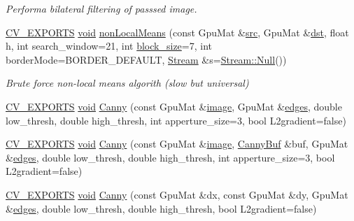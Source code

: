 \begin{DoxyCompactItemize}
\begin{DoxyCompactList}\small\item\em Performa bilateral filtering of passsed image. \end{DoxyCompactList}\item 
\hyperlink{core_2types__c_8h_a1bf9f0e121b54272da02379cfccd0a2b}{C\-V\-\_\-\-E\-X\-P\-O\-R\-T\-S} \hyperlink{legacy_8hpp_a8bb47f092d473522721002c86c13b94e}{void} \hyperlink{namespacecv_1_1gpu_a2d1705c90e1674ce1b9cc26f66c73b59}{non\-Local\-Means} (const Gpu\-Mat \&\hyperlink{legacy_8hpp_a371cd109b74033bc4366f584edd3dacc}{src}, Gpu\-Mat \&\hyperlink{photo__c_8h_aed13e2a25279b24dc954073233fef7a5}{dst}, float h, int search\-\_\-window=21, int \hyperlink{legacy_8hpp_a4a214ca6e8ee1d4806c28a2fe5b4c8e1}{block\-\_\-size}=7, int border\-Mode=B\-O\-R\-D\-E\-R\-\_\-\-D\-E\-F\-A\-U\-L\-T, \hyperlink{classcv_1_1gpu_1_1Stream}{Stream} \&s=\hyperlink{classcv_1_1gpu_1_1Stream_af96c23564834f88333dcb8997df553f1}{Stream\-::\-Null}())
\begin{DoxyCompactList}\small\item\em Brute force non-\/local means algorith (slow but universal) \end{DoxyCompactList}\item 
\hyperlink{core_2types__c_8h_a1bf9f0e121b54272da02379cfccd0a2b}{C\-V\-\_\-\-E\-X\-P\-O\-R\-T\-S} \hyperlink{legacy_8hpp_a8bb47f092d473522721002c86c13b94e}{void} \hyperlink{namespacecv_1_1gpu_a99378c111eb415f3a9145a8ebb939488}{Canny} (const Gpu\-Mat \&\hyperlink{legacy_8hpp_ad62b16ab219ae2483e8a3d921c44cc97}{image}, Gpu\-Mat \&\hyperlink{imgproc__c_8h_a0934986249e7ba69309a154af3260f89}{edges}, double low\-\_\-thresh, double high\-\_\-thresh, int apperture\-\_\-size=3, bool L2gradient=false)
\item 
\hyperlink{core_2types__c_8h_a1bf9f0e121b54272da02379cfccd0a2b}{C\-V\-\_\-\-E\-X\-P\-O\-R\-T\-S} \hyperlink{legacy_8hpp_a8bb47f092d473522721002c86c13b94e}{void} \hyperlink{namespacecv_1_1gpu_a179b2c68febf64ed0a7e4596582e3183}{Canny} (const Gpu\-Mat \&\hyperlink{legacy_8hpp_ad62b16ab219ae2483e8a3d921c44cc97}{image}, \hyperlink{structcv_1_1gpu_1_1CannyBuf}{Canny\-Buf} \&buf, Gpu\-Mat \&\hyperlink{imgproc__c_8h_a0934986249e7ba69309a154af3260f89}{edges}, double low\-\_\-thresh, double high\-\_\-thresh, int apperture\-\_\-size=3, bool L2gradient=false)
\item 
\hyperlink{core_2types__c_8h_a1bf9f0e121b54272da02379cfccd0a2b}{C\-V\-\_\-\-E\-X\-P\-O\-R\-T\-S} \hyperlink{legacy_8hpp_a8bb47f092d473522721002c86c13b94e}{void} \hyperlink{namespacecv_1_1gpu_aa977375225f77939724e3847712f79ac}{Canny} (const Gpu\-Mat \&dx, const Gpu\-Mat \&dy, Gpu\-Mat \&\hyperlink{imgproc__c_8h_a0934986249e7ba69309a154af3260f89}{edges}, double low\-\_\-thresh, double high\-\_\-thresh, bool L2gradient=false)

\end{DoxyCompactItemize}
